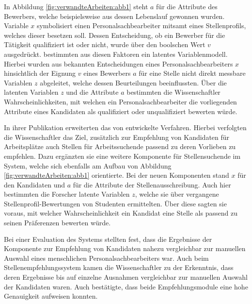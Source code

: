 In Abbildung \ref{fig:verwandteArbeiten:abb1} steht $a$ für die Attribute des Bewerbers, welche beispielsweise aus dessen Lebenslauf gewonnen wurden. Variable $x$ symbolisiert einen Personalsachbearbeiter mitsamt eines Stellenprofils, welches dieser besetzen soll. Dessen Entscheidung, ob ein Bewerber für die Tätigkeit qualifiziert ist oder nicht, wurde über den boolschen Wert $v$ ausgedrückt. \textcite[S. 4ff.]{faerber:2003} bestimmten aus diesen Faktoren ein latentes Variablenmodell. Hierbei wurden aus bekannten Entscheidungen eines Personalsachbearbeiters $x$ hinsichtlich der Eignung $v$ eines Bewerbers $a$ für eine Stelle nicht direkt messbare Variablen $z$ abgeleitet, welche dessen Beurteilungen beeinflussten. Über die latenten Variablen $z$ und die Attribute $a$ bestimmten die Wissenschaftler Wahrscheinlichkeiten, mit welchen ein Personalsachbearbeiter die vorliegenden Attribute eines Kandidaten als qualifiziert oder unqualifiziert bewerten würde.

In ihrer Publikation erweiterten \textcite[S. 4f.]{malinowski:2006} das von \textcite[S. 4ff.]{faerber:2003} entwickelte Verfahren. Hierbei verfolgten die Wissenschaftler das Ziel, zusätzlich zur Empfehlung von Kandidaten für Arbeitsplätze auch Stellen für Arbeitssuchende passend zu deren Vorlieben zu empfehlen. Dazu ergänzten sie eine weitere Komponente für Stellensuchende im System, welche sich ebenfalls am Aufbau von Abbildung \ref{fig:verwandteArbeiten:abb1} orientierte. Bei der neuen Komponenten stand $x$ für den Kandidaten und $a$ für die Attribute der Stellenausschreibung. Auch hier bestimmten die Forscher latente Variablen $z$, welche sie über vergangene Stellenprofil-Bewertungen von Studenten ermittelten. Über diese sagten sie voraus, mit welcher Wahrscheinlichkeit ein Kandidat eine Stelle als passend zu seinen Präferenzen bewerten würde.

Bei einer Evaluation des Systems stellten \textcite[S. 6f.]{malinowski:2006} fest, dass die Ergebnisse der Komponente zur Empfehlung von Kandidaten nahezu vergleichbar zur manuellen Auswahl eines menschlichen Personalsachbearbeiters war. Auch beim Stellenempfehlungssystem kamen die Wissenschaftler zu der Erkenntnis, dass deren Ergebnisse bis auf einzelne Ausnahmen vergleichbar zur manuellen Auswahl der Kandidaten waren. Auch \textcite[S. 7]{keim:2007} bestätigte, dass beide Empfehlungsmodule eine hohe Genauigkeit aufweisen konnten.

